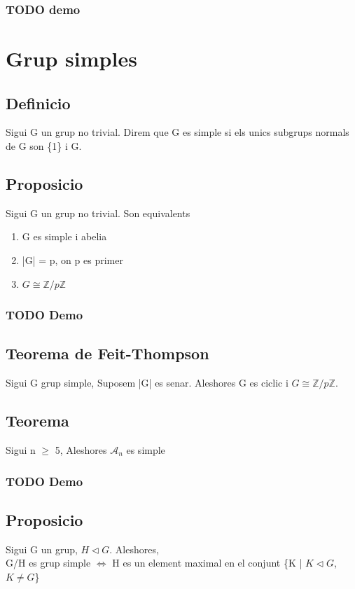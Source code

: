 \documentclass[11pt]{article}
\begin{document}
\subsubsection{{\bfseries\sffamily TODO} demo}
\label{sec:orgd8cc7f2}

\section{Grup simples}
\label{sec:org62e99aa}
\subsection{Definicio}
\label{sec:org727421f}
Sigui G un grup no trivial. Direm que G es simple si els unics subgrups normals de G son \{1\} i G.
\subsection{Proposicio}
\label{sec:org2bc91bb}
Sigui G un grup no trivial. Son equivalents
\begin{enumerate}
\item G es simple i abelia
\item |G| = p, on p es primer
\item \(G \cong \mathbb{Z}/p\mathbb{Z}\)
\end{enumerate}

\subsubsection{{\bfseries\sffamily TODO} Demo}
\label{sec:org2a59ea0}
\subsection{Teorema de Feit-Thompson}
\label{sec:orgf9a3437}
Sigui G grup simple, Suposem |G| es senar. Aleshores G es ciclic i \(G \cong \mathbb{Z}/p\mathbb{Z}\).
\subsection{Teorema}
\label{sec:org6574a0c}
Sigui n \(\geq\) 5, Aleshores \(\mathcal{A}_n\) es simple
\subsubsection{{\bfseries\sffamily TODO} Demo}
\label{sec:orgcc75409}
\subsection{Proposicio}
\label{sec:orgf79ab34}
    Sigui G un grup, \(H \vartriangleleft G\). Aleshores,\\
G/H es grup simple \(\iff\) H es un element maximal en el conjunt \{K | \(K \vartriangleleft G\), \(K \neq G\)\}
\end{document}
